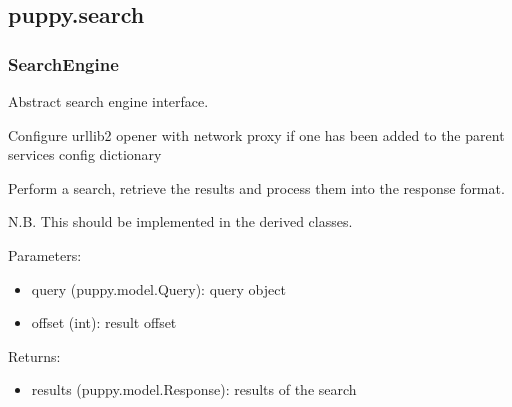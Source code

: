 \documentclass[letterpaper,10pt,english]{sphinxmanual}
\begin{document}
\subsection{puppy.search}
\label{api3.0:module-puppy.search}\label{api3.0:puppy-search}

\subsubsection{SearchEngine}
\label{api3.0:searchengine}

\begin{fulllineitems}
\label{api3.0:puppy.search.SearchEngine}
Abstract search engine interface.

\begin{fulllineitems}
\label{api3.0:puppy.search.SearchEngine.configure_opener}
Configure urllib2 opener with network proxy if one has been added to the parent services config dictionary

\end{fulllineitems}


\begin{fulllineitems}
\label{api3.0:puppy.search.SearchEngine.search}
Perform a search, retrieve the results and process them into the response format.

N.B. This should be implemented in the derived classes.

Parameters:
\begin{itemize}
\item {} 
query (puppy.model.Query): query object

\item {} 
offset (int): result offset

\end{itemize}

Returns:
\begin{itemize}
\item {} 
results (puppy.model.Response): results of the search

\end{itemize}

\end{fulllineitems}


\end{fulllineitems}
\end{document}
